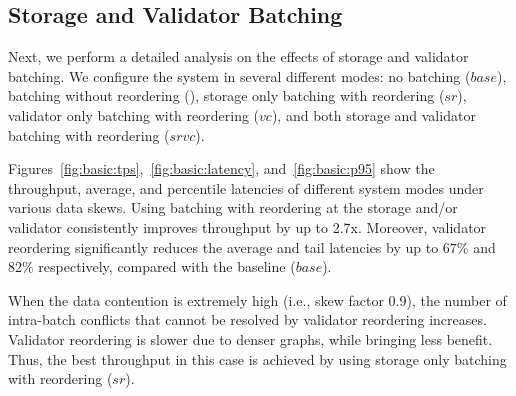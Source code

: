 \subsection{Storage and Validator Batching}
\label{subsec:experiment:batching}

Next, we perform a detailed analysis on the effects of storage and validator batching. We configure the system in several different modes: no batching ($base$), batching without reordering (), storage only batching with reordering ($sr$), validator only batching with reordering
($vc$), and both storage and validator batching with reordering ($srvc$).




Figures~\ref{fig:basic:tps},~\ref{fig:basic:latency}, and~\ref{fig:basic:p95} show the throughput, average, and percentile latencies of different system modes under various data skews. Using batching with reordering at the storage and/or validator consistently improves throughput by up to 2.7x.  Moreover, validator reordering significantly reduces the average and tail latencies by up to $67\%$ and $82\%$ respectively, compared with the baseline ($base$).

When the data contention is extremely high (i.e., skew factor 0.9), the number of intra-batch conflicts
that cannot be resolved by validator reordering increases. Validator reordering
is slower due to denser graphs, while bringing less benefit. Thus, the best throughput in this case is achieved by using storage only batching with reordering ($sr$). 

